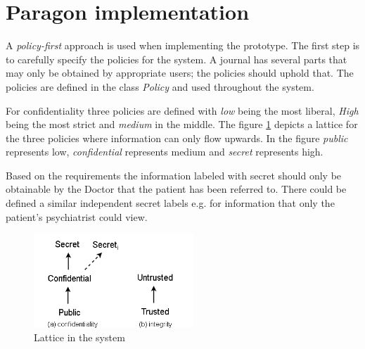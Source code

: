 




\newpage
\section{Paragon implementation}

A \emph{policy-first} approach is used when implementing the prototype. The first step is to carefully specify the policies for the system. A journal has several parts that may only be obtained by appropriate users; the policies should uphold that. The policies are defined in the class \emph{Policy} and used throughout the system.

For confidentiality three policies are defined with \emph{low} being the most liberal, \emph{High} being the most strict and \emph{medium} in the middle. The figure \ref{fig:lattice_confidentiality} depicts a lattice for the three policies where information can only flow upwards. In the figure \emph{public} represents low, \emph{confidential} represents medium and \emph{secret} represents high. 

Based on the requirements the information labeled with secret should only be obtainable by the Doctor that the patient has been referred to. There could be defined a similar independent secret labels e.g. for information that only the patient's psychiatrist could view.  


\begin{figure}[H] 
	\centering
	\includegraphics[width=6cm]{figures/lattice_confidentiality.png}
	\caption{Lattice in the system}
	\label{fig:lattice_confidentiality}
\end{figure}

